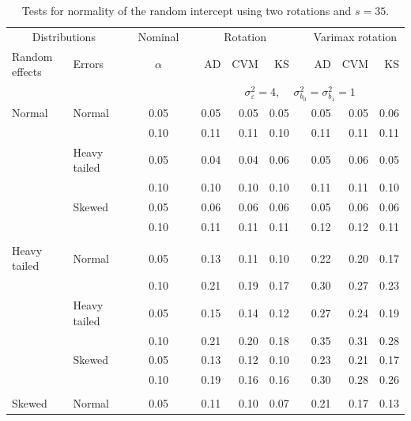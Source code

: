 \documentclass[12pt]{article} %
\begin{document}
\begin{table}[ht]
\caption{Tests for normality of the random intercept using two rotations and $s = 35$.}
\begin{scriptsize}
\begin{center}
\begin{tabular}{ll p{.1cm} c p{.1cm} rrr p{.1cm} rrr}
  \hline
  \multicolumn{2}{c}{Distributions}& & Nominal & &  \multicolumn{3}{c}{Rotation} & & \multicolumn{3}{c}{Varimax rotation} \\ \cline{1-2} \cline{6-8} \cline{10-12}   
  Random effects & Errors & & $\alpha$ & & AD & CVM & KS & & AD & CVM & KS \\ 
   \hline
& && && \multicolumn{7}{c}{$\sigma_{\varepsilon}^2 = 4$, \ \ $\sigma_{b_0}^2 = \sigma_{b_1}^2 = 1$} \\ \cline{6-12}
\rowcolor{gray!20}Normal       & Normal       && 0.05 &&  0.05 & 0.05 & 0.05 && 0.05 & 0.05 & 0.06 \\ 
\rowcolor{gray!20}             &              && 0.10 &&  0.11 & 0.11 & 0.10 && 0.11 & 0.11 & 0.11 \\ 
\rowcolor{gray!20}             & Heavy tailed && 0.05 &&  0.04 & 0.04 & 0.06 && 0.05 & 0.06 & 0.05 \\ 
\rowcolor{gray!20}             &              && 0.10 &&  0.10 & 0.10 & 0.10 && 0.11 & 0.11 & 0.10 \\ 
\rowcolor{gray!20}             & Skewed       && 0.05 &&  0.06 & 0.06 & 0.06 && 0.05 & 0.06 & 0.06 \\ 
\rowcolor{gray!20}             &              && 0.10 &&  0.11 & 0.11 & 0.11 && 0.12 & 0.12 & 0.11 \\ 
             &&&&&&&&&&&\\
Heavy tailed & Normal       && 0.05 &&  0.13 & 0.11 & 0.10 && 0.22 & 0.20 & 0.17 \\ 
             &              && 0.10 &&  0.21 & 0.19 & 0.17 && 0.30 & 0.27 & 0.23 \\ 
             & Heavy tailed && 0.05 &&  0.15 & 0.14 & 0.12 && 0.27 & 0.24 & 0.19 \\ 
             &              && 0.10 &&  0.21 & 0.20 & 0.18 && 0.35 & 0.31 & 0.28 \\ 
             & Skewed       && 0.05 &&  0.13 & 0.12 & 0.10 && 0.23 & 0.21 & 0.17 \\ 
             &              && 0.10 &&  0.19 & 0.16 & 0.16 && 0.30 & 0.28 & 0.26 \\ 
             &&&&&&&&&&&\\
Skewed       & Normal       && 0.05 &&  0.11 & 0.10 & 0.07 && 0.21 & 0.17 & 0.13 \\ 

\end{tabular}
\end{center}
\end{scriptsize}
\end{table}
\end{document}
